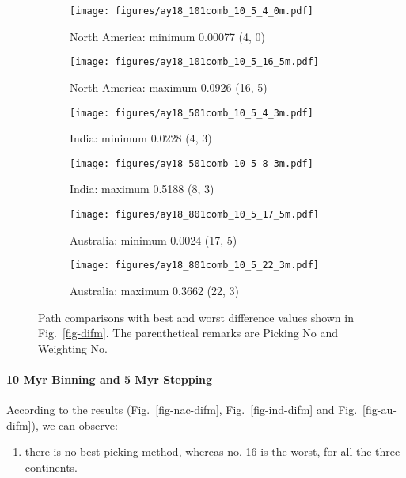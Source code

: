 \begin{figure*}
	\centering
	\begin{subfigure}{.42\textwidth}
		\texttt{[image: figures/ay18\_101comb\_10\_5\_4\_0m.pdf]}
		\caption{North America: minimum 0.00077 (4, 0)}\label{fig-nac-10540m}
	\end{subfigure}
	\begin{subfigure}{.42\textwidth}
		\texttt{[image: figures/ay18\_101comb\_10\_5\_16\_5m.pdf]}
		\caption{North America: maximum 0.0926 (16, 5)}\label{fig-nac-105165m}
	\end{subfigure}
	\vspace{.1em}
	\begin{subfigure}{.42\textwidth}
		\texttt{[image: figures/ay18\_501comb\_10\_5\_4\_3m.pdf]}
		\caption{India: minimum 0.0228 (4, 3)}\label{fig-ind-10543m}
	\end{subfigure}
	\begin{subfigure}{.42\textwidth}
		\texttt{[image: figures/ay18\_501comb\_10\_5\_8\_3m.pdf]}
		\caption{India: maximum 0.5188 (8, 3)}\label{fig-ind-10583m}
	\end{subfigure}
	\vspace{.1em}
	\begin{subfigure}{.42\textwidth}
		\texttt{[image: figures/ay18\_801comb\_10\_5\_17\_5m.pdf]}
		\caption{Australia: minimum 0.0024 (17, 5)}\label{fig-au-105175m}
	\end{subfigure}
	\begin{subfigure}{.42\textwidth}
		\texttt{[image: figures/ay18\_801comb\_10\_5\_22\_3m.pdf]}
		\caption{Australia: maximum 0.3662 (22, 3)}\label{fig-au-105223m}
	\end{subfigure}
	\caption[Best and worst differences (10 Myr bin, 5 Myr
step)]{Path comparisons with best and worst difference values shown in
Fig.~\ref{fig-difm}. The parenthetical remarks are Picking No and Weighting No.}\label{fig-difbwm}
\end{figure*}

\paragraph{10 Myr Binning and 5 Myr Stepping}

According to the results (Fig.~\ref{fig-nac-difm}, Fig.~\ref{fig-ind-difm} and
Fig.~\ref{fig-au-difm}), we can observe:
%
\begin{enumerate}
  \item there is no best picking method, whereas no. 16 is the worst, for all
		the three continents.
\end{enumerate}


